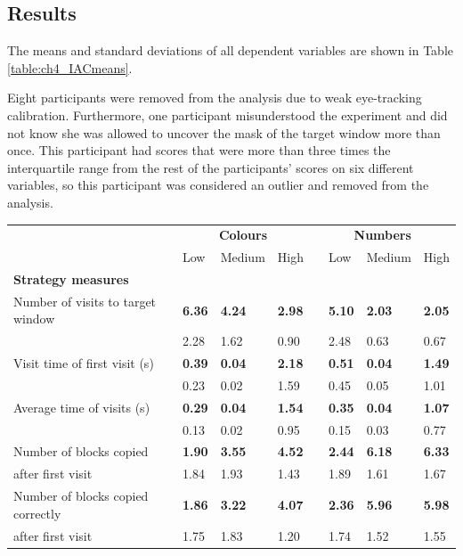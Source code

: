 \documentclass[11pt,oneside]{report}
\newcommand{\ra}[1]{\renewcommand{\arraystretch}{#1}}
\begin{document}
\subsection{Results}
The means and standard deviations of all dependent variables are shown in Table \ref{table:ch4_IACmeans}.

Eight participants were removed from the analysis due to weak eye-tracking calibration. Furthermore, one participant misunderstood the experiment and did not know she was allowed to uncover the mask of the target window more than once. This participant had scores that were more than three times the interquartile range from the rest of the participants' scores on six different variables, so this participant was considered an outlier and removed from the analysis. 


\begin{table}\centering
\ra{1.3}
\begin{tabular}{@{}p{6cm}lllclll@{}}\toprule
 & \multicolumn{3}{c}{\textbf{Colours}} & \multicolumn{3}{r}{\textbf{Numbers}} \\
 \cmidrule{2-4} \cmidrule{6-8}
 & Low & Medium & High && Low & Medium & High\\\midrule
\textbf{Strategy measures}\\
Number of visits to target window & \textbf{6.36} & \textbf{4.24} & \textbf{2.98} && \textbf{5.10} & \textbf{2.03} & \textbf{2.05} \\
						    & 		    2.28 & 		1.62   & 	          0.90 && 		2.48   & 	         0.63  & 	       0.67 \\
Visit time of first visit (s)  		    & \textbf{0.39} & \textbf{0.04} & \textbf{2.18} && \textbf{0.51} & \textbf{0.04} & \textbf{1.49} \\
				       		    &              0.23   & 		  0.02  & 	         1.59  && 		 0.45  & 	         0.05 & 	      1.01 \\
Average time of visits (s)  		    & \textbf{0.29} & \textbf{0.04} & \textbf{1.54} && \textbf{0.35} & \textbf{0.04} & \textbf{1.07} \\
				       		    &              0.13   & 		  0.02  & 	         0.95  && 		 0.15  & 	         0.03 & 	      0.77 \\
Number of blocks copied		    & \textbf{1.90} & \textbf{3.55} & \textbf{4.52} && \textbf{2.44} & \textbf{6.18} & \textbf{6.33} \\
 after first visit 		       		    &              1.84   & 		  1.93  & 	         1.43  && 		 1.89  & 	         1.61 & 	      1.67 \\
Number of blocks copied correctly & \textbf{1.86} & \textbf{3.22} & \textbf{4.07} && \textbf{2.36} & \textbf{5.96} & \textbf{5.98} \\
after first visit 		       		    &              1.75   & 		  1.83  & 	         1.20  && 		 1.74  & 	         1.52 & 	      1.55 \\


\end{tabular}
\end{table}
\end{document}
